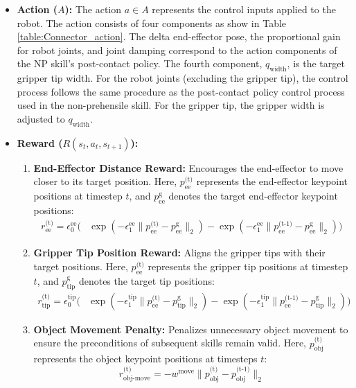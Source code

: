 \begin{itemize}
    \medskip

    \item \textbf{Action (\( A \)):} The action \( a \in A \) represents the control inputs applied to the robot. The action consists of four components as show in Table \ref{table:Connector_action}. The delta end-effector pose, the proportional gain for robot joints, and joint damping correspond to the action components of the NP skill's post-contact policy. The fourth component, $q_\text{width}$, is the target gripper tip width. For the robot joints (excluding the gripper tip), the control process follows the same procedure as the post-contact policy control process used in the non-prehensile skill. For the gripper tip, the gripper width is adjusted to \( q_\text{width} \).
    

    \medskip
    \item \textbf{Reward (\( R(s_t, a_t, s_{t+1}) \)):} 
    \begin{enumerate}
        \item \textbf{End-Effector Distance Reward:} Encourages the end-effector to move closer to its target position. Here, $p^\text{(t)}_\text{ee}$ represents the end-effector keypoint positions at timestep $t$, and $p^\text{g}_\text{ee}$ denotes the target end-effector keypoint positions:
        \[
        \begin{aligned}
        r^\text{(t)}_{\text{ee}} = \epsilon^{\text{ee}}_0 \big( &\exp(-\epsilon^{\text{ee}}_1 \| p^\text{(t)}_\text{ee} - p^\text{g}_\text{ee} \|_2) - \exp(-\epsilon^{\text{ee}}_1 \| p^\text{(t-1)}_\text{ee} - p^\text{g}_\text{ee} \|_2) \big)
        \end{aligned}
        \]
    
        \item \textbf{Gripper Tip Position Reward:} Aligns the gripper tips with their target positions. Here, $p^\text{(t)}_\text{ee}$ represents the gripper tip positions at timestep $t$, and $p^\text{g}_\text{tip}$ denotes the target tip positions:
        \[
        \begin{aligned}
        r^\text{(t)}_{\text{tip}} = \epsilon^{\text{tip}}_0 \big( &\exp(-\epsilon^{\text{tip}}_1 \| p^\text{(t)}_\text{ee} - p^\text{g}_\text{tip} \|_2)
        - \exp(-\epsilon^{\text{tip}}_1 \| p^\text{(t-1)}_\text{ee} - p^\text{g}_\text{tip} \|_2) \big)
        \end{aligned}
        \]
    
        \item \textbf{Object Movement Penalty:} Penalizes unnecessary object movement to ensure the preconditions of subsequent skills remain valid. Here, $p^\text{(t)}_\text{obj}$ represents the object keypoint positions at timesteps $t$:
        \[
        r^\text{(t)}_{\text{obj-move}} = -w^{\text{move}} \| p^\text{(t)}_\text{obj} - p^\text{(t-1)}_\text{obj} \|_2
        \]
    

\end{enumerate}
\end{itemize}
